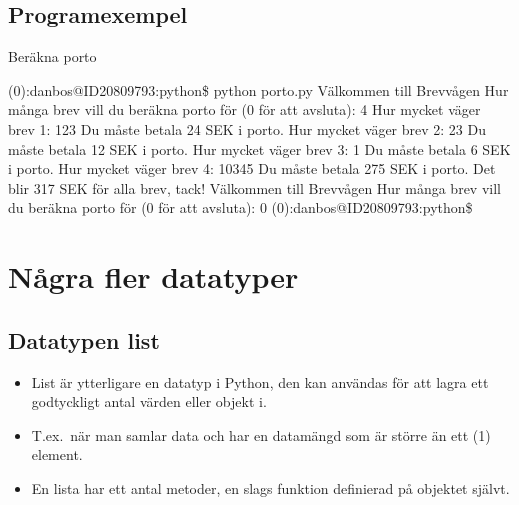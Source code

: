\documentclass{beamer}
\begin{document}
\subsection{Programexempel}

\begin{frame}{\insertsubsectionhead}{Beräkna porto}
  
\end{frame}

\begin{frame}[fragile]{\insertsubsectionhead}
  \begin{terminal}
(0):danbos@ID20809793:python\$ python porto.py
Välkommen till Brevvågen
Hur många brev vill du beräkna porto för (0 för att avsluta): 4
Hur mycket väger brev 1: 123
Du måste betala 24 SEK i porto.
Hur mycket väger brev 2: 23
Du måste betala 12 SEK i porto.
Hur mycket väger brev 3: 1
Du måste betala 6 SEK i porto.
Hur mycket väger brev 4: 10345
Du måste betala 275 SEK i porto.
Det blir 317 SEK för alla brev, tack!
Välkommen till Brevvågen
Hur många brev vill du beräkna porto för (0 för att avsluta): 0
(0):danbos@ID20809793:python\$
  \end{terminal}
\end{frame}


\section{Några fler datatyper}

\subsection{Datatypen list}

\begin{frame}{\insertsubsectionhead}
  \begin{itemize}
    \item List är ytterligare en datatyp i Python, den kan användas för att 
      lagra ett godtyckligt antal värden eller objekt i.

    \item T.ex.\ när man samlar data och har en datamängd som är större än ett 
      (1) element.

    \item En lista har ett antal metoder, en slags funktion definierad på 
      objektet självt.

  \end{itemize}
\end{frame}
\end{document}
